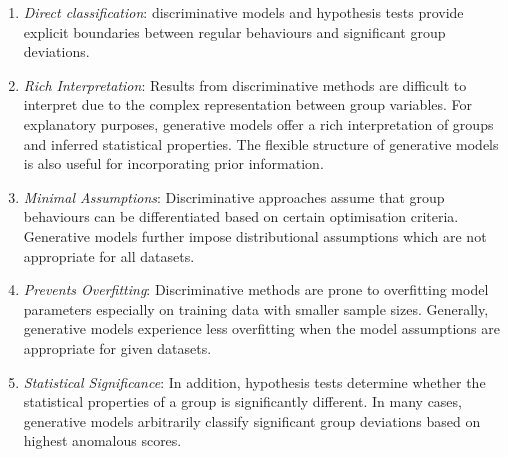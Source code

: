 \begin{table}[H]
	\tabcolsep=0.3cm
	\renewcommand{\arraystretch}{1.2}
	\begin{center}
	\end{center}
	\medskip
		\caption{  Summary of advantages of   group deviation detection techniques in terms of 	 discriminative methods, generative models and hypothesis tests. If a procedure has a particular advantage, a tick label is present whereas if a procedure lacks an advantage, a cross is displayed.  }
 \label{Tab:DG}
\end{table}  

	
	
\begin{enumerate}[{$\mathcal{A}$}1] \setlength\itemsep{5pt}
\item   {\it Direct classification}:  discriminative models and hypothesis tests provide explicit boundaries between regular   behaviours and significant group deviations. 
 \item  {\it Rich Interpretation}: Results from discriminative methods  are difficult to interpret due to the complex representation between group   variables. For explanatory purposes, 
  generative models offer a rich interpretation of  groups and inferred statistical properties.    The flexible structure of generative models is also useful for incorporating prior information.
  \item  {\it  Minimal  Assumptions}: 
  Discriminative approaches assume that group behaviours can be differentiated based on certain optimisation criteria.   Generative models further impose distributional assumptions which are not  appropriate for all datasets. 
  \item  {\it Prevents Overfitting}: Discriminative methods are prone to overfitting model parameters especially on  training data with smaller sample sizes. 
 Generally, generative models experience less overfitting  when the model assumptions are appropriate for given datasets.  
   \item  {\it Statistical Significance}: In addition,  hypothesis tests determine whether the statistical properties of a group is significantly different. In many cases, generative models arbitrarily classify    significant group deviations based on highest anomalous scores. 
\end{enumerate}	




